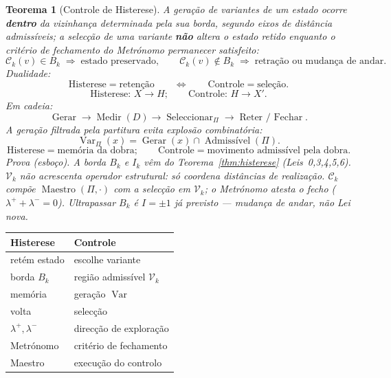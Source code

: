 \documentclass[11pt,a4paper]{article}
\newtheorem{teorema}{Teorema}
\begin{document}
\begin{teorema}[Controle de Histerese]\label{thm:controle-histerese}
A geração de variantes de um estado ocorre \textbf{dentro} da vizinhança
determinada pela sua borda, segundo eixos de distância admissíveis; a
selecção de uma variante \textbf{não} altera o estado retido enquanto o
critério de fechamento do Metrónomo permanecer satisfeito:
\[
\boxed{
\mathcal{C}_k(v)\in B_k
\;\Rightarrow\;
\text{estado preservado},
}
\qquad
\boxed{
\mathcal{C}_k(v)\notin B_k
\;\Rightarrow\;
\text{retração ou mudança de andar}.
}
\]
Dualidade:
\[
\boxed{
\text{Histerese}=\text{retenção}
\qquad\Longleftrightarrow\qquad
\text{Controle}=\text{seleção}.
}
\]
\[
\boxed{
\text{Histerese: }X\to H;
\qquad
\text{Controle: }H\to X'.
}
\]
Em cadeia:
\[
\boxed{
\operatorname{Gerar}
\to
\operatorname{Medir}(D)
\to
\operatorname{Seleccionar}_{\Pi}
\to
\operatorname{Reter\ /\ Fechar}.
}
\]
A geração filtrada pela partitura evita explosão combinatória:
\[
\boxed{
\operatorname{Var}_{\Pi}(x)
=
\operatorname{Gerar}(x)
\cap
\operatorname{Admissível}(\Pi).
}
\]
\[
\boxed{
\text{Histerese}=\text{memória da dobra};
\qquad
\text{Controle}=\text{movimento admissível pela dobra}.
}
\]
\emph{Prova (esboço).} A borda $B_k$ e $I_k$ vêm do Teorema~\ref{thm:histerese}
(Leis~0,3,4,5,6). $\mathcal{V}_k$ não acrescenta operador estrutural: só
coordena distâncias de realização. $\mathcal{C}_k$ compõe
$\operatorname{Maestro}(\Pi,\cdot)$ com a selecção em $\mathcal{V}_k$; o
Metrónomo atesta o fecho ($\lambda^{+}+\lambda^{-}=0$). Ultrapassar $B_k$
é $I=\pm1$ já previsto --- mudança de andar, não Lei nova.
\end{teorema}

\begin{center}\small
\begin{tabular}{@{}ll@{}}
\toprule
Histerese & Controle \\
\midrule
retém estado & escolhe variante \\
borda $B_k$ & região admissível $\mathcal{V}_k$ \\
memória & geração $\operatorname{Var}$ \\
volta & selecção \\
$\lambda^{+},\lambda^{-}$ & direcção de exploração \\
Metrónomo & critério de fechamento \\
Maestro & execução do controlo \\
\bottomrule
\end{tabular}
\end{center}
\end{document}
